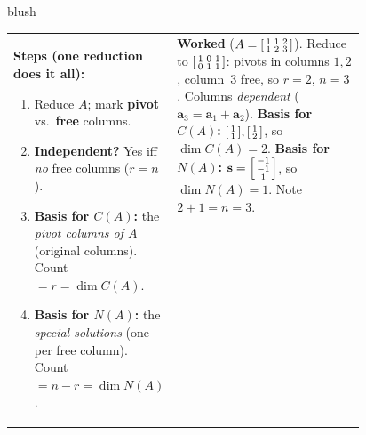 \documentclass[10pt]{article}
\newcommand{\svec}{\mathbf{s}}
\begin{document}
\begin{skillbox}{blush}
\begin{tabularx}{\linewidth}{@{}p{0.46\linewidth} X@{}}
\textbf{Steps (one reduction does it all):}
\begin{enumerate}[leftmargin=1.3em, nosep]
  \item Reduce $A$; mark \textbf{pivot} vs.\ \textbf{free} columns.
  \item \textbf{Independent?} Yes iff \emph{no} free columns ($r=n$).
  \item \textbf{Basis for $C(A)$:} the \emph{pivot columns of $A$} (original columns). Count $=r=\dim C(A)$.
  \item \textbf{Basis for $N(A)$:} the \emph{special solutions} (one per free column). Count $=n-r=\dim N(A)$.
\end{enumerate}
&
\vspace{-2pt}
\textbf{Worked} ($A=\begin{bsmallmatrix} 1&1&2\\1&2&3 \end{bsmallmatrix}$). Reduce to
$\begin{bsmallmatrix} 1&0&1\\0&1&1 \end{bsmallmatrix}$: pivots in columns $1,2$, column~$3$ free, so $r=2$,
$n=3$. Columns \emph{dependent} ($\mathbf{a}_3=\mathbf{a}_1+\mathbf{a}_2$). \textbf{Basis for $C(A)$:}
$\begin{bsmallmatrix} 1\\1 \end{bsmallmatrix},\begin{bsmallmatrix} 1\\2 \end{bsmallmatrix}$, so
$\dim C(A)=2$. \textbf{Basis for $N(A)$:} $\svec=\begin{bsmallmatrix} -1\\-1\\1 \end{bsmallmatrix}$, so
$\dim N(A)=1$. Note $2+1=n=3$.
\end{tabularx}
\end{skillbox}
\end{document}
